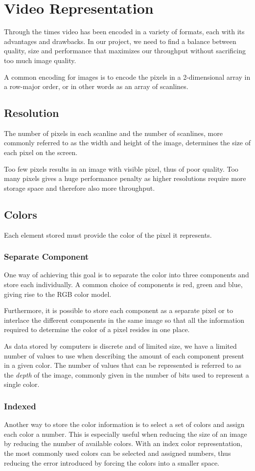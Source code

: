 \section{Video Representation}
Through the times video has been encoded in a variety of formats, each with its advantages and drawbacks.
In our project, we need to find a balance between quality, size and performance that maximizes our throughput without sacrificing too much image quality.

A common encoding for images is to encode the pixels in a 2-dimensional array in a row-major order, or in other words as an array of scanlines.

\subsection{Resolution}
The number of pixels in each scanline and the number of scanlines, more commonly referred to as the width and height of the image, determines the size of each pixel on the screen.

Too few pixels results in an image with visible pixel, thus of poor quality.
Too many pixels gives a huge performance penalty as higher resolutions require more storage space and therefore also more throughput.

\subsection{Colors}
Each element stored must provide the color of the pixel it represents.

\subsubsection{Separate Component}
One way of achieving this goal is to separate the color into three components and store each individually.
A common choice of components is red, green and blue, giving rise to the RGB color model.

Furthermore, it is possible to store each component as a separate pixel or to interlace the different components in the same image so that all the information required to determine the color of a pixel resides in one place.

As data stored by computers is discrete and of limited size, we have a limited number of values to use when describing the amount of each component present in a given color.
The number of values that can be represented is referred to as the \textit{depth} of the image, commonly given in the number of bits used to represent a single color.

\subsubsection{Indexed}
Another way to store the color information is to select a set of colors and assign each color a number.
This is especially useful when reducing the size of an image by reducing the number of available colors.
With an index color representation, the most commonly used colors can be selected and assigned numbers, thus reducing the error introduced by forcing the colors into a smaller space.
